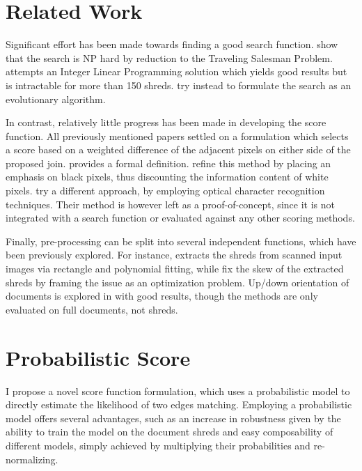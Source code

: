 \documentclass[letterpaper]{article}
\begin{document}
\section{
\fontsize{12pt}{15pt} 
\selectfont
Related Work}
\fontsize{10pt}{12pt} 
\selectfont
Significant effort has been made towards finding a good search function. \cite{P1} show that the search is NP hard by reduction to the Traveling Salesman Problem. \cite{P2} attempts an Integer Linear Programming solution which yields good results but is intractable for more than 150 shreds. \cite{P3,P4} try instead to formulate the search as an evolutionary algorithm. 

In contrast, relatively little progress has been made in developing the score function. All previously mentioned papers settled on a formulation which selects a score based on a weighted difference of the adjacent pixels on either side of the proposed join. \cite{P7} provides a formal definition. 
\cite{P5} refine this method by placing an emphasis on black pixels, thus discounting the information content of white pixels. \cite{P8} try a different approach, by employing optical character recognition techniques. Their method is however left as a proof-of-concept, since it is not integrated with a search function or evaluated against any other scoring methods.

Finally, pre-processing can be split into several independent functions, which have been previously explored. For instance, \cite{P9} extracts the shreds from scanned input images via rectangle and polynomial fitting, while \cite{P10} fix the skew of the extracted shreds by framing the issue as an optimization problem. Up/down orientation of documents is explored in \cite{P11,P12} with good results, though the methods are only evaluated on full documents, not shreds.
\section{
\fontsize{12pt}{15pt} 
\selectfont
Probabilistic Score}
\fontsize{10pt}{12pt} 
\selectfont
I propose a novel score function formulation, which uses a probabilistic model to directly estimate the likelihood of two edges matching. Employing a probabilistic model offers several advantages, such as an increase in robustness given by the ability to train the model on the document shreds and easy composability of different models, simply achieved by multiplying their probabilities and re-normalizing.
\end{document}
